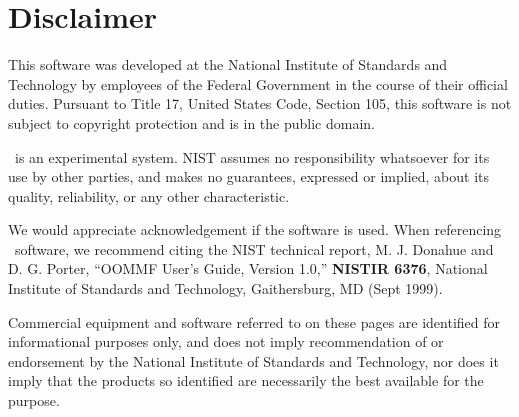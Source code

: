 \section*{Disclaimer}

This software was developed at the National Institute of Standards and
Technology by employees of the Federal Government in the course of their
official duties.  Pursuant to Title 17, United States Code, Section 105,
this software is not subject to copyright protection and is in the
public domain.

\OOMMF\ is an experimental system.  NIST assumes no responsibility
whatsoever for its use by other parties, and makes no guarantees,
expressed or implied, about its quality, reliability, or any other
characteristic.

We would appreciate acknowledgement if the software is used.  When
referencing \OOMMF\ software, we recommend citing the NIST technical
report, M. J. Donahue and D. G. Porter, ``OOMMF User's Guide, Version
1.0,'' \textbf{NISTIR 6376}, National Institute of Standards and
Technology, Gaithersburg, MD (Sept 1999).

Commercial equipment and software referred to on these pages are
identified for informational purposes only, and does not imply
recommendation of or endorsement by the National Institute of Standards
and Technology, nor does it imply that the products so identified are
necessarily the best available for the purpose.
